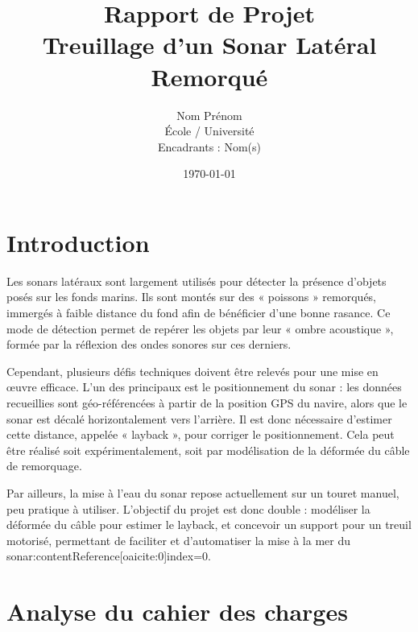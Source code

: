 \documentclass[12pt,a4paper]{article}
\title{\textbf{Rapport de Projet} \\
\vspace{0.3cm}
\large Treuillage d’un Sonar Latéral Remorqué}
\author{Nom Prénom \\
École / Université \\
Encadrants : Nom(s)}
\date{\today}
\begin{document}
\maketitle

\tableofcontents

\newpage

\section{Introduction}


Les sonars latéraux sont largement utilisés pour détecter la présence d’objets posés sur les fonds marins.
Ils sont montés sur des « poissons » remorqués, immergés à faible distance du fond afin de bénéficier d’une bonne rasance.
Ce mode de détection permet de repérer les objets par leur « ombre acoustique », formée par la réflexion des ondes sonores sur ces derniers.


Cependant, plusieurs défis techniques doivent être relevés pour une mise en œuvre efficace.
L’un des principaux est le positionnement du sonar : les données recueillies sont géo-référencées à partir de la
position GPS du navire, alors que le sonar est décalé horizontalement vers l’arrière. Il est donc nécessaire d’estimer
cette distance, appelée « layback », pour corriger le positionnement. Cela peut être réalisé soit expérimentalement,
soit par modélisation de la déformée du câble de remorquage.


Par ailleurs, la mise à l’eau du sonar repose actuellement sur un touret manuel, peu pratique à utiliser.
L’objectif du projet est donc double : modéliser la déformée du câble pour estimer le layback,
et concevoir un support pour un treuil motorisé, permettant de faciliter et d’automatiser la mise à la mer du
sonar:contentReference[oaicite:0]{index=0}.


\section{Analyse du cahier des charges}

\end{document}
